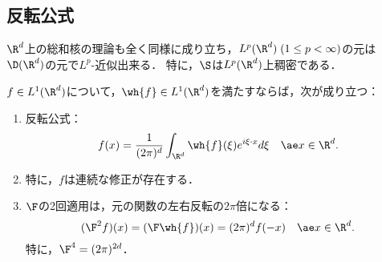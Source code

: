 \documentclass[uplatex,dvipdfmx]{jsreport}
\begin{document}
\subsection{反転公式}

\begin{tcolorbox}[colframe=ForestGreen, colback=ForestGreen!10!white,breakable,colbacktitle=ForestGreen!40!white,coltitle=black,fonttitle=\bfseries\sffamily,
title=]
    $\R^d$上の総和核の理論も全く同様に成り立ち，$L^p(\R^d)\;(1\le p<\infty)$の元は$\D(\R^d)$の元で$L^p$-近似出来る．
    特に，$\S$は$L^p(\R^d)$上稠密である．
\end{tcolorbox}

\begin{theorem}[$\R^d$上の反転公式]\label{thm-inversion-theorem-in-Rd}
    $f\in L^1(\R^d)$について，$\wh{f}\in L^1(\R^d)$を満たすならば，次が成り立つ：
    \begin{enumerate}
        \item 反転公式：
        \[f(x)=\frac{1}{(2\pi)^d}\int_{\R^d}\wh{f}(\xi)e^{i\xi\cdot x}d\xi\quad \ae x\in\R^d.\]
        \item 特に，$f$は連続な修正が存在する．
        \item $\F$の2回適用は，元の関数の左右反転の$2\pi$倍になる：
        \[(\F^2f)(x)=(\F\wh{f})(x)=(2\pi)^df(-x)\quad\ae x\in\R^d.\]
        特に，$\F^4=(2\pi)^{2d}$．
    \end{enumerate}
\end{theorem}
\end{document}
